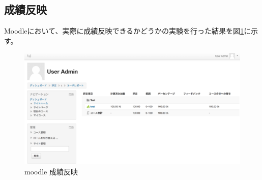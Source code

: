 \subsection{成績反映}
Moodleにおいて、実際に成績反映できるかどうかの実験を行った結果を図\ref{fig:moodle score}に示す。
\begin{figure}[htbp]
  \begin{center}
    \includegraphics[scale=0.2]{img/score.png}
    \caption{moodle 成績反映}
    \label{fig:moodle score}
  \end{center}
\end{figure}
